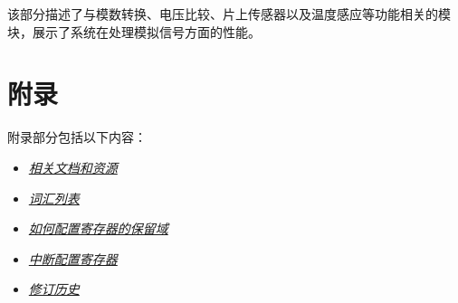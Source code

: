 \documentclass[openany, 10pt]{book}
\begin{document}

该部分描述了与模数转换、电压比较、片上传感器以及温度感应等功能相关的模块，展示了系统在处理模拟信号方面的性能。




\part{附录}\label{appendix}

附录部分包括以下内容：

\begin{itemize}
    \item \hyperref[sec:resources]{\textit{相关文档和资源}}
    \item \hyperref[glossary]{\textit{词汇列表}}
    \item \hyperref[programming-reserved-field]{\textit{如何配置寄存器的保留域}}
    \item \hyperref[interrupt-config-registers]{\textit{中断配置寄存器}}
    \item \hyperref[revision-history]{\textit{修订历史}}
\end{itemize}



\clearpage


\clearpage


\clearpage


\clearpage


\clearpage


\clearpage

\end{document}
